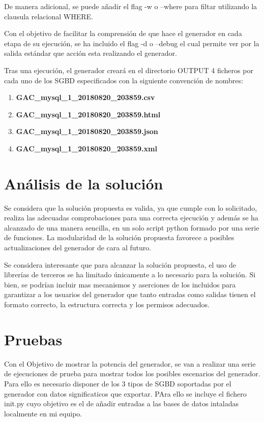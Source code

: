 \documentclass[a4paper,11pt]{book}
\begin{document}
De manera adicional, se puede añadir el flag -w o --where para filtar utilizando la clausula relacional WHERE. 

Con el objetivo de facilitar la comprensión de que hace el generador en cada etapa de su ejecución, se ha incluido el flag -d o --debug el cual permite ver por la salida estándar que acción esta realizando el generador.   

Tras una ejecución, el generador creará en el directorio OUTPUT 4 ficheros por cada uno de los SGBD especificados con la siguiente convención de nombres:

\begin{enumerate}
\item \textbf{GAC\_mysql\_1\_20180820\_203859.csv}
\item \textbf{GAC\_mysql\_1\_20180820\_203859.html}
\item \textbf{GAC\_mysql\_1\_20180820\_203859.json}
\item \textbf{GAC\_mysql\_1\_20180820\_203859.xml}
\end{enumerate}

\section{Análisis de la solución}

	Se considera que la solución propuesta es valida, ya que cumple con lo solicitado, realiza las adecuadas comprobaciones para una correcta ejecución y además se ha alcanzado de una manera sencilla, en un solo script python formado por una serie de funciones. La modularidad de la solución propuesta favorece a posibles actualizaciones del generador de cara al futuro.

Se considera interesante que para alcanzar la solución propuesta, el uso de librerías de terceros se ha limitado únicamente a lo necesario para la solución. Si bien, se podrían incluir mas mecanismos y aserciones de los incluidos para garantizar a los usuarios del generador que tanto entradas como salidas tienen el formato correcto, la estructura correcta y los permisos adecuados. 
 
\section{Pruebas}

Con el Objetivo de mostrar la potencia del generador, se van a realizar una serie de ejecuciones de prueba para mostrar todos los posibles escenarios del generador. Para ello es necesario disponer de los 3 tipos de SGBD soportadas por el generador con datos significaticos que exportar. PAra ello se incluye el fichero init.py cuyo objetivo es el de añadir entradas a las bases de datos intaladas localmente en mi equipo. 
\end{document}
